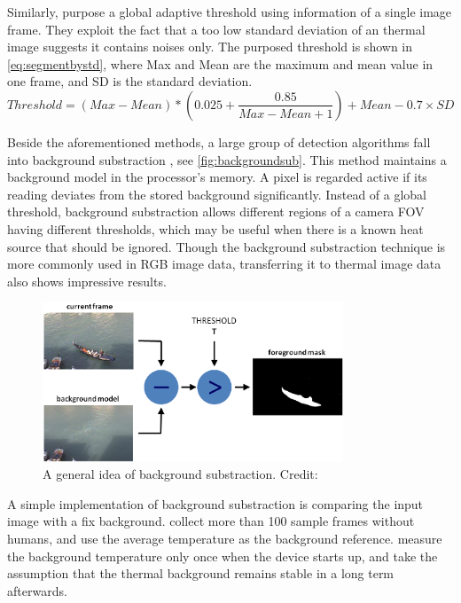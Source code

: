 Similarly, \citeauthor{jeong2014probabilistic} \cite{jeong2014probabilistic} purpose a global adaptive threshold using information of a single image frame. They exploit the fact that a too low standard deviation of an thermal image suggests it contains noises only. The purposed threshold is shown in \autoref{eq:segmentbystd}, where Max and Mean are the maximum and mean value in one frame, and SD is the standard deviation.
\begin{equation}\label{eq:segmentbystd}
  Threshold = (Max-Mean)*\left(0.025+\frac{0.85}{Max-Mean+1}\right) + Mean - 0.7\times SD
\end{equation}

Beside the aforementioned methods, a large group of detection algorithms fall into background substraction \cite{backgroundsubsurvey}, see \autoref{fig:backgroundsub}. This method maintains a background model in the processor's memory. A pixel is regarded active if its reading deviates from the stored background significantly. Instead of a global threshold, background substraction allows different regions of a camera FOV having different thresholds, which may be useful when there is a known heat source that should be ignored. Though the background substraction technique is more commonly used in RGB image data, transferring it to thermal image data also shows impressive results.
\begin{figure}
  \centering
  \includegraphics[width=0.8\textwidth]{figures/Background_Subtraction.png}
  \caption{A general idea of background substraction. Credit: \cite{opencvBackgroundSub}}\label{fig:backgroundsub}
\end{figure}

A simple implementation of background substraction is comparing the input image with a fix background. \citeauthor{basu2015tracking} \cite{basu2015tracking} collect more than 100 sample frames without humans, and use the average temperature as the background reference. \citeauthor{firstflow} \cite{firstflow} measure the background temperature only once when the device starts up, and take the assumption that the thermal background remains stable in a long term afterwards.

